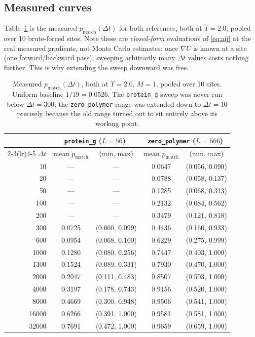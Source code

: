 \documentclass[11pt,a4paper]{article}
\newcommand{\dt}{\Delta t}
\newcommand{\gradU}{\nabla U}
\newcommand{\pmatch}{p_{\mathrm{match}}}
\newcommand{\Mass}{M}
\begin{document}
\subsection{Measured curves}

Table~\ref{tab:pmatch} is the measured $\pmatch(\dt)$ for both references,
both at $T=2.0$, pooled over 10 brute-forced sites. Note these are
\emph{closed-form} evaluations of \eqref{eq:aij} at the real measured
gradients, not Monte Carlo estimates: once $\gradU$ is known at a site (one
forward/backward pass), sweeping arbitrarily many $\dt$ values costs nothing
further. This is why extending the sweep downward was free.

\begin{table}[htbp]
\centering
\begin{tabular}{r cc cc}
\toprule
 & \multicolumn{2}{c}{\texttt{protein\_g} ($L=56$)}
 & \multicolumn{2}{c}{\texttt{zero\_polymer} ($L=566$)} \\
\cmidrule(lr){2-3}\cmidrule(lr){4-5}
$\dt$ & mean $\pmatch$ & (min, max) & mean $\pmatch$ & (min, max) \\
\midrule
    10 & ---    & ---                & 0.0647 & (0.056, 0.090) \\
    20 & ---    & ---                & 0.0788 & (0.058, 0.137) \\
    50 & ---    & ---                & 0.1285 & (0.068, 0.313) \\
   100 & ---    & ---                & 0.2132 & (0.084, 0.562) \\
   200 & ---    & ---                & 0.3479 & (0.121, 0.818) \\
   300 & 0.0725 & (0.060, 0.099)     & 0.4436 & (0.160, 0.933) \\
   600 & 0.0954 & (0.068, 0.160)     & 0.6229 & (0.275, 0.999) \\
  1000 & 0.1280 & (0.080, 0.256)     & 0.7447 & (0.403, 1.000) \\
  1300 & 0.1524 & (0.089, 0.331)     & 0.7930 & (0.470, 1.000) \\
  2000 & 0.2047 & (0.111, 0.483)     & 0.8507 & (0.503, 1.000) \\
  4000 & 0.3197 & (0.178, 0.743)     & 0.9156 & (0.520, 1.000) \\
  8000 & 0.4669 & (0.300, 0.948)     & 0.9506 & (0.541, 1.000) \\
 16000 & 0.6266 & (0.391, 1.000)     & 0.9581 & (0.581, 1.000) \\
 32000 & 0.7691 & (0.472, 1.000)     & 0.9659 & (0.659, 1.000) \\
\bottomrule
\end{tabular}
\caption{Measured $\pmatch(\dt)$, both at $T=2.0$, $\Mass=1$, pooled over 10
sites. Uniform baseline $1/19 = 0.0526$. The \texttt{protein\_g} sweep was
never run below $\dt=300$; the \texttt{zero\_polymer} range was extended down
to $\dt=10$ precisely because the old range turned out to sit entirely above
its working point.}
\label{tab:pmatch}
\end{table}
\end{document}
